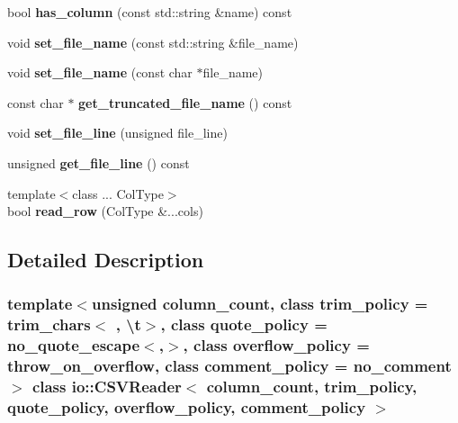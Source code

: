 \begin{DoxyCompactItemize}
bool {\bfseries has\+\_\+column} (const std\+::string \&name) const
\item 
\mbox{\label{classio_1_1_c_s_v_reader_a4096c1e43a4fba2b4f5ae21d047b5fbc}} 
void {\bfseries set\+\_\+file\+\_\+name} (const std\+::string \&file\+\_\+name)
\item 
\mbox{\label{classio_1_1_c_s_v_reader_a5f1dc083a8fa8661f5ecdcf6aebc7b24}} 
void {\bfseries set\+\_\+file\+\_\+name} (const char $\ast$file\+\_\+name)
\item 
\mbox{\label{classio_1_1_c_s_v_reader_abc6321895152f5a34959b499da6512ee}} 
const char $\ast$ {\bfseries get\+\_\+truncated\+\_\+file\+\_\+name} () const
\item 
\mbox{\label{classio_1_1_c_s_v_reader_a1303bd6a2eb0d3d7c743212e52839ac4}} 
void {\bfseries set\+\_\+file\+\_\+line} (unsigned file\+\_\+line)
\item 
\mbox{\label{classio_1_1_c_s_v_reader_a065f805596018d1568b81152e6a22e0c}} 
unsigned {\bfseries get\+\_\+file\+\_\+line} () const
\item 
\mbox{\label{classio_1_1_c_s_v_reader_a61ecdcaa62c024bf97c4e5d133478d7e}} 
{\footnotesize template$<$class ... Col\+Type$>$ }\\bool {\bfseries read\+\_\+row} (Col\+Type \&...cols)
\end{DoxyCompactItemize}


\subsection{Detailed Description}
\subsubsection*{template$<$unsigned column\+\_\+count, class trim\+\_\+policy = trim\+\_\+chars$<$\textquotesingle{} \textquotesingle{}, \textquotesingle{}\textbackslash{}t\textquotesingle{}$>$, class quote\+\_\+policy = no\+\_\+quote\+\_\+escape$<$\textquotesingle{},\textquotesingle{}$>$, class overflow\+\_\+policy = throw\+\_\+on\+\_\+overflow, class comment\+\_\+policy = no\+\_\+comment$>$\newline
class io\+::\+C\+S\+V\+Reader$<$ column\+\_\+count, trim\+\_\+policy, quote\+\_\+policy, overflow\+\_\+policy, comment\+\_\+policy $>$}



